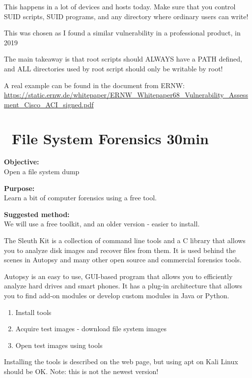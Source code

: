 \documentclass[a4paper,11pt,notitlepage]{report}
\begin{document}
This happens in a lot of devices and hosts today. Make sure that you control SUID scripts, SUID programs, and any directory where ordinary users can write!

This was chosen as I found a similar vulnerability in a professional product, in 2019

The main takeaway is that root scripts should ALWAYS have a PATH defined, and ALL directories used by root script should only be writable by root!

A real example can be found in the document from ERNW: \\
{\small\url{https://static.ernw.de/whitepaper/ERNW_Whitepaper68_Vulnerability_Assessment_Cisco_ACI_signed.pdf}}



\chapter{\faExclamationTriangle\ File System Forensics 30min}
\label{ex:file-system-forensics}

{\bf Objective:}\\
 Open a file system dump

{\bf Purpose:}\\
Learn a bit of computer forensics using a free tool.

{\bf Suggested method:}\\
We will use a free toolkit, and an older version - easier to install.

The Sleuth Kit is a collection of command line tools and a C library that allows you to analyze disk images and recover files from them. It is used behind the scenes in Autopsy and many other open source and commercial forensics tools.

Autopsy is an easy to use, GUI-based program that allows you to efficiently analyze hard drives and smart phones. It has a plug-in architecture that allows you to find add-on modules or develop custom modules in Java or Python.



\begin{enumerate}
\item Install tools
\item Acquire test images - download file system images
\item Open test images using tools
\end{enumerate}

Installing the tools is described on the web page, but using apt on Kali Linux should be OK. Note: this is not the newest version!
\end{document}
